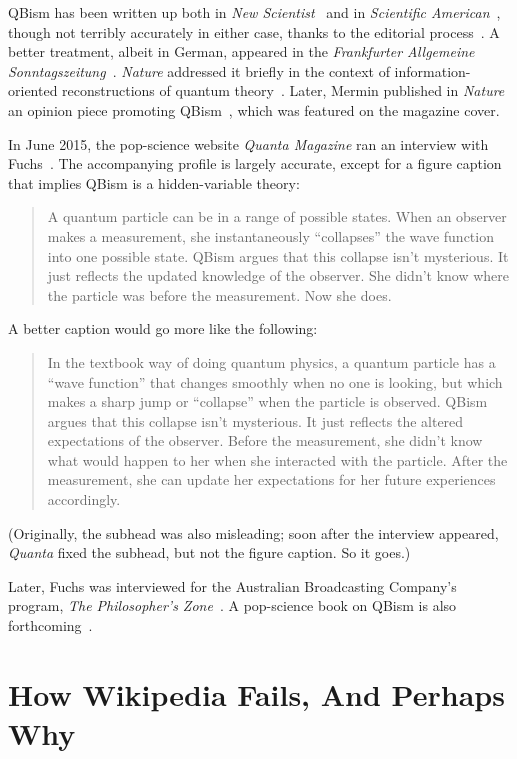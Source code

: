 \documentclass[aps,pra,superscriptaddress,12pt,tightenlines,nofootinbib]{revtex4-2}
\newcommand{\booktitle}{\textsl}
\begin{document}
QBism has been written up both in \booktitle{New
  Scientist}~\cite{Chalmers2014} and in \booktitle{Scientific
  American}~\cite{VonBaeyer2013}, though not terribly accurately in
either case, thanks to the editorial process~\cite{Mermin14b,
  Mermin-Vienna, Mermin-Bell}.  A better treatment, albeit in German,
appeared in the \booktitle{Frankfurter Allgemeine
  Sonntagszeitung}~\cite{VonRauchhaupt2014}. \booktitle{Nature}
addressed it briefly in the context of information-oriented
reconstructions of quantum theory~\cite{Ball2013}.  Later, Mermin
published in \booktitle{Nature} an opinion piece promoting
QBism~\cite{Mermin14}, which was featured on the magazine cover.

In June 2015, the pop-science website \booktitle{Quanta Magazine} ran
an interview with Fuchs~\cite{Gefter2015}.  The accompanying profile
is largely accurate, except for a figure caption that implies QBism is
a hidden-variable theory:
\begin{quotation}
\noindent A quantum particle can be in a range of possible
states. When an observer makes a measurement, she instantaneously
``collapses'' the wave function into one possible state. QBism argues
that this collapse isn't mysterious. It just reflects the updated
knowledge of the observer. She didn't know where the particle was
before the measurement. Now she does.
\end{quotation}
A better caption would go more like the following:
\begin{quotation}
\noindent In the textbook way of doing quantum physics, a quantum
particle has a ``wave function'' that changes smoothly when no one is
looking, but which makes a sharp jump or ``collapse'' when the
particle is observed. QBism argues that this collapse isn't
mysterious. It just reflects the altered expectations of the
observer. Before the measurement, she didn't know what would happen to
her when she interacted with the particle. After the measurement, she
can update her expectations for her future experiences accordingly.
\end{quotation}
(Originally, the subhead was also misleading; soon after the interview
appeared, \booktitle{Quanta} fixed the subhead, but not the figure
caption.  So it goes.)

Later, Fuchs was interviewed for the Australian Broadcasting Company's
program, \booktitle{The Philosopher's Zone}~\cite{philzone}.  A
pop-science book on QBism is also forthcoming~\cite{VonBaeyer2016}.

\section{How Wikipedia Fails, And Perhaps Why}
\end{document}
